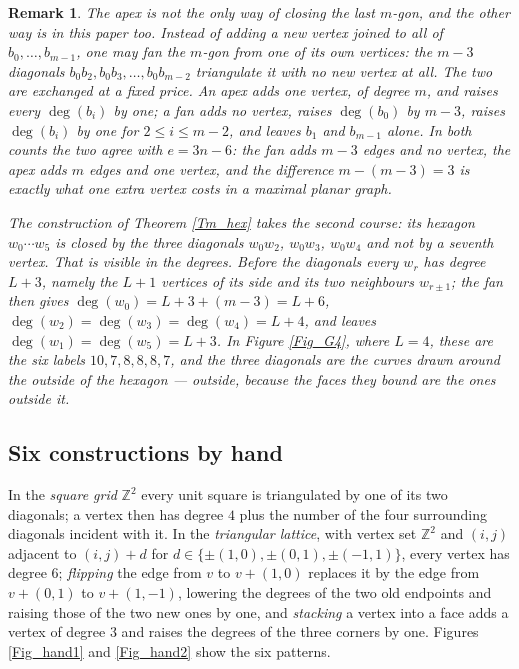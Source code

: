 \documentclass[12pt,a4paper]{article}%
\newtheorem{remark}[theorem]{Remark}
\begin{document}
\begin{remark}
\label{Rem_fan}The apex is not the only way of closing the last $m$-gon, and the other way is in this paper
too. Instead of adding a new vertex joined to all of $b_{0},\ldots ,b_{m-1}$, one may \emph{fan} the
$m$-gon from one of its own vertices: the $m-3$ diagonals $b_{0}b_{2},b_{0}b_{3},\ldots ,b_{0}b_{m-2}$
triangulate it with no new vertex at all. The two are exchanged at a fixed price. An apex adds one vertex,
of degree $m$, and raises every $\deg (b_{i})$ by one; a fan adds no vertex, raises $\deg (b_{0})$ by
$m-3$, raises $\deg (b_{i})$ by one for $2\leq i\leq m-2$, and leaves $b_{1}$ and $b_{m-1}$ alone. In both
counts the two agree with $e=3n-6$: the fan adds $m-3$ edges and no vertex, the apex adds $m$ edges and
one vertex, and the difference $m-(m-3)=3$ is exactly what one extra vertex costs in a maximal planar graph.

The construction of Theorem \ref{Tm_hex} takes the second course: its hexagon $w_{0}\cdots w_{5}$ is closed
by the three diagonals $w_{0}w_{2}$, $w_{0}w_{3}$, $w_{0}w_{4}$ and not by a seventh vertex. That is
visible in the degrees. Before the diagonals every $w_{r}$ has degree $L+3$, namely the $L+1$ vertices of
its side and its two neighbours $w_{r\pm 1}$; the fan then gives $\deg (w_{0})=L+3+(m-3)=L+6$,
$\deg (w_{2})=\deg (w_{3})=\deg (w_{4})=L+4$, and leaves $\deg (w_{1})=\deg (w_{5})=L+3$. In Figure
\ref{Fig_G4}, where $L=4$, these are the six labels $10,7,8,8,8,7$, and the three diagonals are the curves
drawn around the outside of the hexagon --- outside, because the faces they bound are the ones outside it.

\end{remark}

\subsection{Six constructions by hand}

In the \emph{square grid} $\mathbb{Z}^{2}$ every unit square is triangulated by one of its two diagonals; a vertex then
has degree $4$ plus the number of the four surrounding diagonals incident with it. In the \emph{triangular lattice},
with vertex set $\mathbb{Z}^{2}$ and $(i,j)$ adjacent to $(i,j)+d$ for $d\in \{\pm (1,0),\pm (0,1),\pm (-1,1)\}$,
every vertex has degree $6$; \emph{flipping} the edge from $v$ to $v+(1,0)$ replaces it by the edge from $v+(0,1)$ to
$v+(1,-1)$, lowering the degrees of the two old endpoints and raising those of the two new ones by one, and
\emph{stacking} a vertex into a face adds a vertex of degree $3$ and raises the degrees of the three corners by one.
Figures \ref{Fig_hand1} and \ref{Fig_hand2} show the six patterns.
\end{document}
